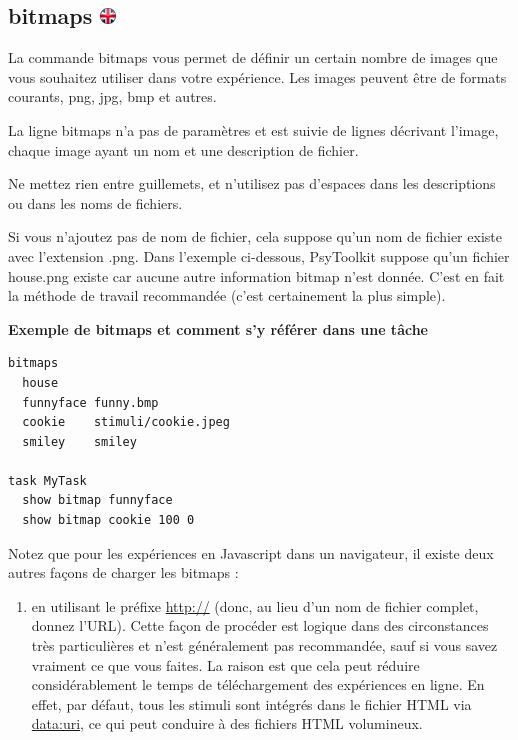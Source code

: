 \documentclass[
]{book}
\providecommand{\tightlist}{%
  \setlength{\itemsep}{0pt}\setlength{\parskip}{0pt}}
\begin{document}
\hypertarget{bitmaps}{%
\subsection[bitmaps ]{\texorpdfstring{bitmaps \href{https://www.psytoolkit.org/doc3.4.0/syntax.html\#_bitmaps}{\protect\includegraphics{img/ukflag.png}}}{bitmaps }}\label{bitmaps}}

La commande bitmaps vous permet de définir un certain nombre de images que vous souhaitez utiliser dans votre expérience. Les images peuvent être de formats courants, png, jpg, bmp et autres.

La ligne bitmaps n'a pas de paramètres et est suivie de lignes décrivant l'image, chaque image ayant un nom et une description de fichier.

Ne mettez rien entre guillemets, et n'utilisez pas d'espaces dans les descriptions ou dans les noms de fichiers.

Si vous n'ajoutez pas de nom de fichier, cela suppose qu'un nom de fichier existe avec l'extension .png. Dans l'exemple ci-dessous, PsyToolkit suppose qu'un fichier house.png existe car aucune autre information bitmap n'est donnée. C'est en fait la méthode de travail recommandée (c'est certainement la plus simple).

\textbf{Exemple de bitmaps et comment s'y référer dans une tâche}

\begin{verbatim}
bitmaps
  house
  funnyface funny.bmp
  cookie    stimuli/cookie.jpeg
  smiley    smiley

task MyTask
  show bitmap funnyface
  show bitmap cookie 100 0
\end{verbatim}

Notez que pour les expériences en Javascript dans un navigateur, il existe deux autres façons de charger les bitmaps :

\begin{enumerate}
\def\labelenumi{\arabic{enumi}.}
\tightlist
\item
  en utilisant le préfixe \url{http://} (donc, au lieu d'un nom de fichier complet, donnez l'URL). Cette façon de procéder est logique dans des circonstances très particulières et n'est généralement pas recommandée, sauf si vous savez vraiment ce que vous faites. La raison est que cela peut réduire considérablement le temps de téléchargement des expériences en ligne. En effet, par défaut, tous les stimuli sont intégrés dans le fichier HTML via \url{data:uri}, ce qui peut conduire à des fichiers HTML volumineux.
\end{enumerate}
\end{document}
